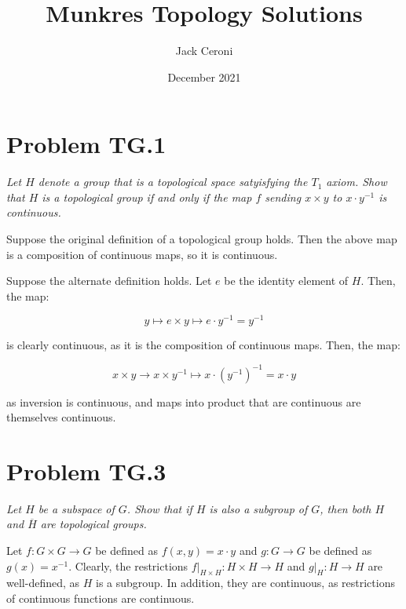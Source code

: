 \documentclass[10pt, oneside]{amsart}
\title{Munkres Topology Solutions}
\author{Jack Ceroni}
\date{December 2021}
\begin{document}
    \maketitle

    \tableofcontents

    \vspace{.25in}

    \newpage

    \hrulefill

    \section{Problem TG.1}

    \textit{Let $H$ denote a group that is a topological space satyisfying the $T_1$ axiom. Show that $H$ is a topological group if and only if the map $f$ sending $x \times y$ to $x \cdot y^{-1}$
      is continuous.}
    \newline

    Suppose the original definition of a topological group holds. Then the above map is a composition of continuous maps, so it is continuous.
    \newline

    Suppose the alternate definition holds. Let $e$ be the identity element of $H$. Then, the map:

    $$y \mapsto e \times y \mapsto e \cdot y^{-1} = y^{-1}$$

    is clearly continuous,
    as it is the composition of continuous maps. Then, the map:

    $$x \times y \rightarrow x \times y^{-1} \mapsto x \cdot (y^{-1})^{-1} = x \cdot y$$

    as inversion is continuous, and maps into product that are continuous are themselves continuous.

    \hrulefill

    \section{Problem TG.3}

    \textit{Let $H$ be a subspace of $G$. Show that if $H$ is also a subgroup of $G$, then both $H$ and $\overline{H}$ are topological groups.}
    \newline

    Let $f : G \times G \rightarrow G$ be defined as $f(x, y) = x \cdot y$ and $g : G \rightarrow G$ be defined as $g(x) = x^{-1}$. Clearly, the restrictions $f|_{H \times H} : H \times H \rightarrow H$ and
    $g|_{H} : H \rightarrow H$ are well-defined, as $H$ is a subgroup. In addition, they are continuous, as restrictions of continuous functions are continuous.
    \newline
\end{document}
